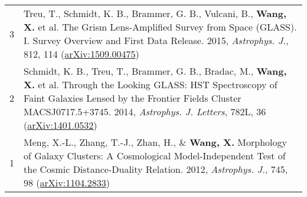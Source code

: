 \documentclass[letterpaper,10pt]{article}
\begin{document}
\begin{longtable}{rp{6.3in}}
$$3   &   Treu, T., Schmidt, K. B., Brammer, G. B., Vulcani, B., \textbf{Wang, X.} et al. The Grism Lens-Amplified Survey from Space (GLASS). I. Survey Overview and First Data Release. 2015, \textit{Astrophys. J.}, 812, 114 (\href{https://arxiv.org/abs/1509.00475}{arXiv:1509.00475})   \\
2   &   Schmidt, K. B., Treu, T., Brammer, G. B., Bradac, M., \textbf{Wang, X.} et al. Through the Looking GLASS: HST Spectroscopy of Faint Galaxies Lensed by the Frontier Fields Cluster MACSJ0717.5+3745. 2014, \textit{Astrophys. J. Letters}, 782L, 36 (\href{http://arxiv.org/abs/1401.0532}{arXiv:1401.0532})  \\
1   &   Meng, X.-L., Zhang, T.-J., Zhan, H., \& \textbf{Wang, X.} Morphology of Galaxy Clusters: A Cosmological Model-Independent Test of the Cosmic Distance-Duality Relation. 2012, \textit{Astrophys. J.}, 745, 98 (\href{http://arxiv.org/abs/1104.2833}{arXiv:1104.2833})

\end{longtable}
\endgroup
\end{document}
